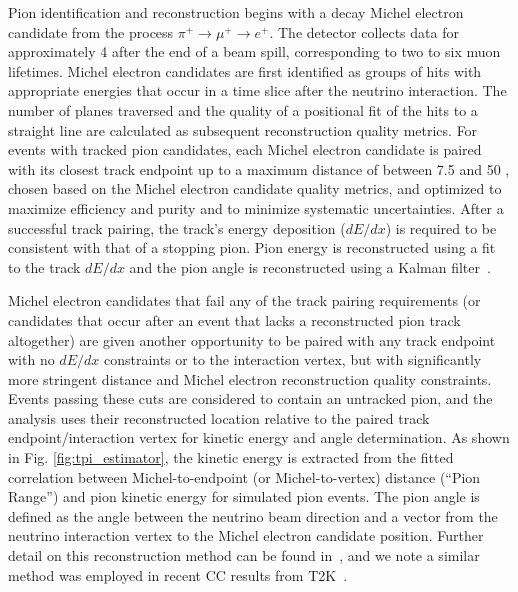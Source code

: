 \documentclass[aps,prl,twocolumn,showpacs,superscriptaddress,letterpaper,showkeys,superscriptaddress,floatfix,nofootinbib]{revtex4-1}
\begin{document}
Pion identification and reconstruction begins with a decay Michel electron candidate from the process $\pi^+\rightarrow\mu^+\rightarrow e^+$.  The \minerva detector collects data for approximately 4 \micros after the end of a beam spill, corresponding to two to six muon lifetimes. Michel electron candidates are first identified as groups of hits with appropriate energies that occur in a time slice after the neutrino interaction. The number of planes traversed and the quality of a positional fit of the hits to a straight line are calculated as subsequent reconstruction quality metrics. For events with tracked pion candidates, each Michel electron candidate is paired with its closest track endpoint up to a maximum distance of between 7.5 \cm and 50 \cm, chosen based on the Michel electron candidate quality metrics, and optimized to maximize efficiency and purity and to minimize systematic uncertainties. After a successful track pairing, the track's energy deposition ($dE/dx$) is required to be consistent with that of a stopping pion. Pion energy is reconstructed using a fit to the track $dE/dx$ and the pion angle is reconstructed using a Kalman filter~\cite{Kalman1,Kalman2}.

Michel electron candidates that fail any of the track pairing requirements (or candidates that occur after an event that lacks a reconstructed pion track altogether) are given another opportunity to be paired with any track endpoint with no $dE/dx$ constraints or to the interaction vertex, but with significantly more stringent distance and Michel electron reconstruction quality constraints. Events passing these cuts are considered to contain an untracked pion, and the analysis uses their reconstructed location relative to the paired track endpoint/interaction vertex for kinetic energy and angle determination.  As shown in Fig. \ref{fig:tpi_estimator}, the kinetic energy is extracted from the fitted correlation between Michel-to-endpoint (or Michel-to-vertex) distance (``Pion Range'') and pion kinetic energy \Tpi for simulated pion events. The pion angle \thpi is defined as the angle between the neutrino beam direction and a vector from the neutrino interaction vertex to the Michel electron candidate position. Further detail on this reconstruction method can be found in~\cite{SultanaThesis}, and we note a similar method was employed in recent \nue CC \pip results from T2K~\cite{klhv-7t6h}.

\end{document}
